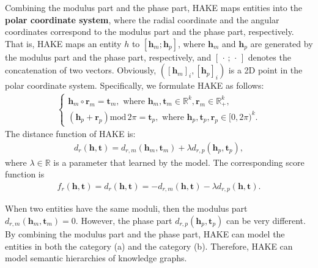 \documentclass[letterpaper]{article} \usepackage{aaai20}  \usepackage{times}  \usepackage{helvet} \usepackage{courier}  \usepackage[hyphens]{url}  \usepackage{graphicx} \urlstyle{rm} \def\UrlFont{\rm}  \usepackage{graphicx}  \frenchspacing  \setlength{\pdfpagewidth}{8.5in}  \setlength{\pdfpageheight}{11in}
\begin{document}
Combining the modulus part and the phase part, HAKE maps entities into the \textbf{polar coordinate system}, where the radial coordinate and the angular coordinates correspond to the modulus part and the phase part, respectively. That is, HAKE maps an entity $h$ to $[\textbf{h}_m;\textbf{h}_p]$, where $\textbf{h}_m$ and $\textbf{h}_p$ are generated by the modulus part and the phase part, respectively, and $[\,\cdot\,; \,\cdot\,]$ denotes the concatenation of two vectors. Obviously, $([\textbf{h}_m]_i,[\textbf{h}_p]_i)$ is a 2D point in the polar coordinate system. Specifically, we formulate HAKE as follows:
\begin{align*}
    \begin{cases}
    \textbf{h}_m\circ \textbf{r}_m=\textbf{t}_m, \text{ where } {\textbf{h}_m,\textbf{t}_m\in\mathbb{R}^k,\textbf{r}_m}\in\mathbb{R}_+^k,\\
    (\textbf{h}_p+\textbf{r}_p)\text{mod}\, 2\pi=\textbf{t}_p, \text{ where } {\textbf{h}_p,\textbf{t}_p,\textbf{r}_p}\in [0, 2\pi)^k.
    \end{cases}
\end{align*}
The distance function of HAKE is:
\begin{align*}
    d_{r}(\textbf{h},\textbf{t})=d_{r,m}(\textbf{h}_m,\textbf{t}_m)+\lambda d_{r,p}(\textbf{h}_p,\textbf{t}_p),
\end{align*}
where $\lambda\in\mathbb{R}$ is a parameter that learned by the model.
The corresponding score function is
\begin{align*}
    f_r(\textbf{h},\textbf{t})=d_r(\textbf{h},\textbf{t})=-d_{r,m}(\textbf{h},\textbf{t})-\lambda d_{r,p}(\textbf{h},\textbf{t}).
\end{align*}

When two entities have the same moduli, then the modulus part $d_{r,m}(\textbf{h}_m,\textbf{t}_m)=0$. However, the phase part $d_{r,p}(\textbf{h}_p,\textbf{t}_p)$ can be very different. By combining the modulus part and the phase part, HAKE can model the entities in both the category (a) and the category (b). Therefore, HAKE can model semantic hierarchies of knowledge graphs.
\end{document}

